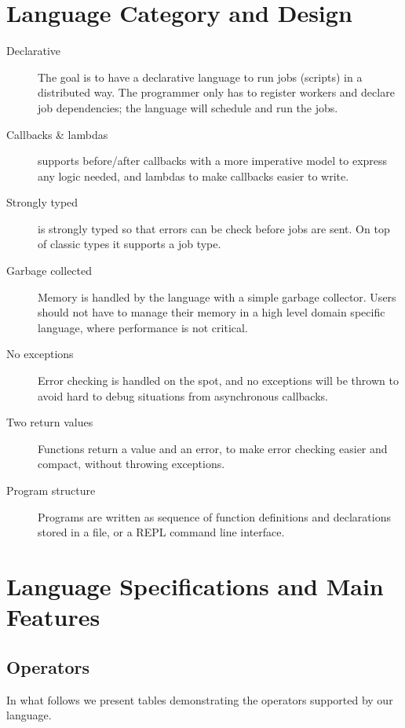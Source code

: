 \section{Language Category and Design}
\label{sect:desg}
\begin{description}
\item[Declarative] The goal is to have a declarative language to run jobs
(scripts) in a distributed way. The programmer only has to register workers and
declare job dependencies; the language will schedule and run the jobs.
\item[Callbacks \& lambdas] \lang{} supports before/after callbacks
with a more imperative model to express any logic needed, and
lambdas to make callbacks easier to write.
\item[Strongly typed] \lang{} is strongly typed so that errors can be check
before jobs are sent. On top of classic types it supports a job type.
\item[Garbage collected] Memory is handled by the language with a simple
garbage collector. Users should not have to manage their memory in a high
level domain specific language, where performance is not critical.
\item[No exceptions] Error checking is handled on the spot, and no exceptions
will be thrown to avoid hard to debug situations from asynchronous callbacks.
\item[Two return values] Functions return a value and an error, to make error
checking easier and compact, without throwing exceptions.
\item[Program structure] Programs are written as sequence of function
definitions and declarations stored in a file, or a REPL command line
interface.
\end{description}

\section{Language Specifications and Main Features}
\label{sect:spec}

\subsection*{Operators}
In what follows we present tables demonstrating the operators supported by our
language.%


